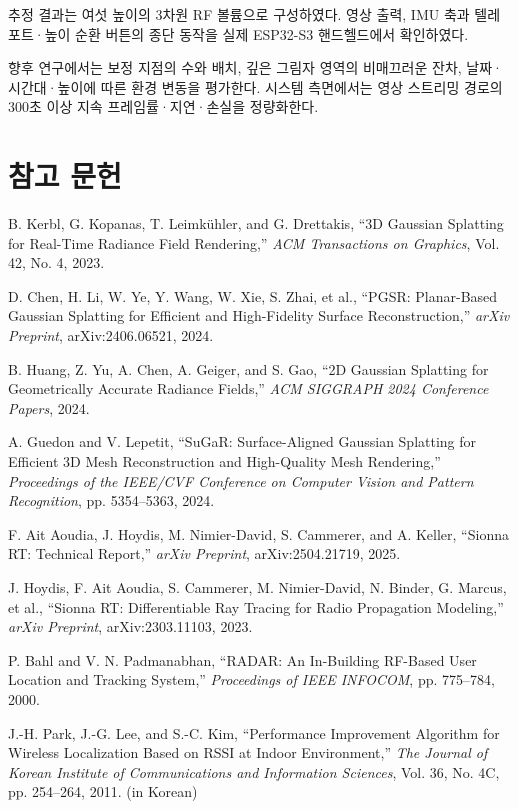 \documentclass[11pt,a4paper]{article}
\begin{document}
추정 결과는 여섯 높이의 3차원 RF 볼륨으로 구성하였다. 영상 출력, IMU 축과 텔레포트·높이 순환 버튼의 종단
동작을 실제 ESP32-S3 핸드헬드에서 확인하였다.

향후 연구에서는 보정 지점의 수와 배치, 깊은 그림자 영역의 비매끄러운 잔차, 날짜·시간대·높이에 따른 환경
변동을 평가한다. 시스템 측면에서는 영상 스트리밍 경로의 300초 이상 지속 프레임률·지연·손실을 정량화한다.

\section{참고 문헌}

\begin{enumerate}[label={[\arabic*]}, leftmargin=2.6em, labelsep=0.6em, itemsep=3pt, topsep=4pt]
  \item B. Kerbl, G. Kopanas, T. Leimkühler, and G. Drettakis, ``3D Gaussian Splatting for Real-Time Radiance Field Rendering,'' \textit{ACM Transactions on Graphics}, Vol. 42, No. 4, 2023.
  \item D. Chen, H. Li, W. Ye, Y. Wang, W. Xie, S. Zhai, et al., ``PGSR: Planar-Based Gaussian Splatting for Efficient and High-Fidelity Surface Reconstruction,'' \textit{arXiv Preprint}, arXiv:2406.06521, 2024.
  \item B. Huang, Z. Yu, A. Chen, A. Geiger, and S. Gao, ``2D Gaussian Splatting for Geometrically Accurate Radiance Fields,'' \textit{ACM SIGGRAPH 2024 Conference Papers}, 2024.
  \item A. Guedon and V. Lepetit, ``SuGaR: Surface-Aligned Gaussian Splatting for Efficient 3D Mesh Reconstruction and High-Quality Mesh Rendering,'' \textit{Proceedings of the IEEE/CVF Conference on Computer Vision and Pattern Recognition}, pp. 5354--5363, 2024.
  \item F. Ait Aoudia, J. Hoydis, M. Nimier-David, S. Cammerer, and A. Keller, ``Sionna RT: Technical Report,'' \textit{arXiv Preprint}, arXiv:2504.21719, 2025.
  \item J. Hoydis, F. Ait Aoudia, S. Cammerer, M. Nimier-David, N. Binder, G. Marcus, et al., ``Sionna RT: Differentiable Ray Tracing for Radio Propagation Modeling,'' \textit{arXiv Preprint}, arXiv:2303.11103, 2023.
  \item P. Bahl and V. N. Padmanabhan, ``RADAR: An In-Building RF-Based User Location and Tracking System,'' \textit{Proceedings of IEEE INFOCOM}, pp. 775--784, 2000.
  \item J.-H. Park, J.-G. Lee, and S.-C. Kim, ``Performance Improvement Algorithm for Wireless Localization Based on RSSI at Indoor Environment,'' \textit{The Journal of Korean Institute of Communications and Information Sciences}, Vol. 36, No. 4C, pp. 254--264, 2011. (in Korean)

\end{enumerate}
\end{document}
